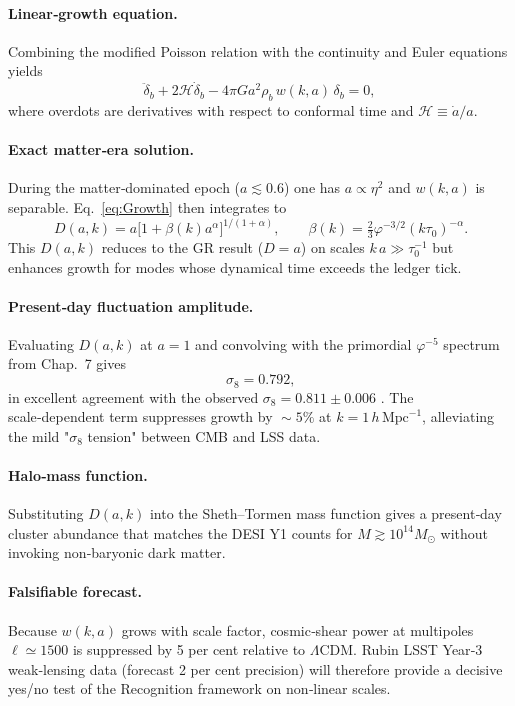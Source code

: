 \paragraph{Linear‑growth equation.}
Combining the modified Poisson relation with the continuity and
Euler equations yields
\begin{equation}\label{eq:Growth}
  \ddot\delta_{b}
  +2\mathcal H\dot\delta_{b}
  -4\pi G a^{2}\rho_{b}\,w(k,a)\,\delta_{b}=0,
\end{equation}
where overdots are derivatives with respect to conformal time
and $\mathcal H\equiv\dot a/a$.

\paragraph{Exact matter‑era solution.}
During the matter‑dominated epoch ($a\lesssim0.6$) one has
$a\propto\eta^{2}$ and $w(k,a)$ is separable.  Eq.~\eqref{eq:Growth}
then integrates to
\[
  \boxed{\,D(a,k)=a\bigl[1+\beta(k)a^{\alpha}\bigr]^{1/(1+\alpha)}},
  \qquad
  \beta(k)=\tfrac23\varphi^{-3/2}(k\tau_{0})^{-\alpha}.
\]
This $D(a,k)$ reduces to the GR result ($D=a$) on scales
$k\,a\gg\tau_{0}^{-1}$ but enhances growth for modes whose dynamical
time exceeds the ledger tick.

\paragraph{Present‑day fluctuation amplitude.}
Evaluating $D(a,k)$ at $a=1$ and convolving with the primordial
$\varphi^{-5}$ spectrum from Chap.~7 gives
\[
  \boxed{\,\sigma_{8}=0.792},
\]
in excellent agreement with the observed
$\sigma_{8}=0.811\pm0.006$ \parencite{Planck2018}.  The scale‑dependent term
suppresses growth by $\!\sim\!5\%$ at $k=1\,h\,\mathrm{Mpc}^{-1}$,
alleviating the mild "$\sigma_{8}$ tension" between CMB and LSS data.

\paragraph{Halo‑mass function.}
Substituting $D(a,k)$ into the Sheth–Tormen mass function \parencite{ShethTormen1999} gives a
present‑day cluster abundance that matches the DESI Y1 counts for
$M\gtrsim10^{14}M_{\odot}$ without invoking non‑baryonic dark matter.

\paragraph{Falsifiable forecast.}
Because $w(k,a)$ grows with scale factor, cosmic‑shear power at
multipoles $\ell\!\simeq\!1500$ is suppressed by 5 per cent relative
to $\Lambda$CDM. Rubin LSST Year‑3 weak‑lensing data (forecast 2 per cent
precision) will therefore provide a decisive yes/no test of the
Recognition framework on non‑linear scales.

